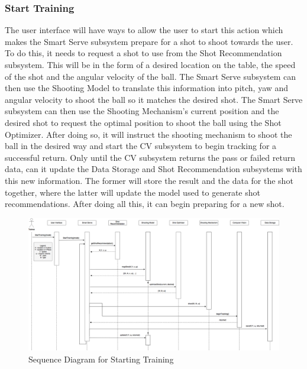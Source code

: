 \documentclass[11pt]{article}
\begin{document}
\subsubsection{Start Training}
The user interface will have ways to allow the user to start this action which makes the Smart Serve subsystem prepare for a shot to shoot towards the user. To do this, it needs to request a shot to use from the Shot Recommendation subsystem. This will be in the form of a desired location on the table, the speed of the shot and the angular velocity of the ball. The Smart Serve subsystem can then use the Shooting Model to translate this information into pitch, yaw and angular velocity to shoot the ball so it matches the desired shot. The Smart Serve subsystem can then use the Shooting Mechanism's current position and the desired shot to request the optimal position to shoot the ball using the Shot Optimizer. After doing so, it will instruct the shooting mechanism to shoot the ball in the desired way and start the CV subsystem to begin tracking for a successful return. Only until the CV subsystem returns the pass or failed return data, can it update the Data Storage and Shot Recommendation subsystems with this new information. The former will store the result and the data for the shot together, where the latter will update the model used to generate shot recommendations. After doing all this, it can begin preparing for a new shot.
\begin{figure}[H]
   \centering
   \includegraphics[width=\textwidth]{img/SequenceDiagram-Start.png}
   \caption{Sequence Diagram for Starting Training}
   \label{fig:start}
\end{figure}
\end{document}

